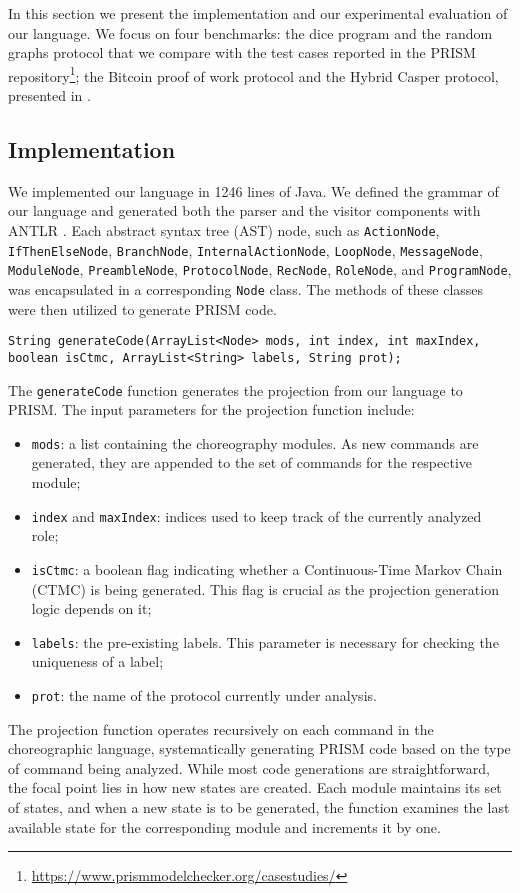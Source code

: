 In this section we present the implementation and our experimental evaluation of our language. 
We focus on four benchmarks: the dice program and the random graphs protocol that we compare with the  
test cases reported in the PRISM repository\footnote{\url{https://www.prismmodelchecker.org/casestudies/}}; 
the Bitcoin proof of work protocol and the Hybrid Casper protocol, 
presented in \cite{DBLP:journals/concurrency/BistarelliNGLMV23,DBLP:journals/distribledger/GallettaLMV23}.
\subsection{Implementation}
We implemented our language in 1246 lines of Java.
We defined the grammar of our language and generated both the parser and the visitor components with ANTLR \cite{ANTLR}.
Each abstract syntax tree (AST) node, such as {\tt ActionNode}, {\tt IfThenElseNode}, {\tt BranchNode}, {\tt InternalActionNode}, {\tt LoopNode}, {\tt MessageNode}, {\tt ModuleNode}, {\tt PreambleNode}, {\tt ProtocolNode}, {\tt RecNode}, {\tt RoleNode}, and {\tt ProgramNode}, was encapsulated in a corresponding {\tt Node} class. The methods of these classes were then utilized to generate PRISM code.
\begin{lstlisting}[language=Eclipse,caption=The \texttt{generateCode} function.,label=genfun1,numbers=none]
	String generateCode(ArrayList<Node> mods, int index, int maxIndex, boolean isCtmc, ArrayList<String> labels, String prot);	
\end{lstlisting}
The {\tt generateCode} function generates the projection from our language to PRISM.
The input parameters for the projection function include:
\begin{itemize}
\item \texttt{mods}: a list containing the choreography modules. As new commands are generated, they are appended to the set of commands for the respective module;
\item \texttt{index} and \texttt{maxIndex}: indices used to keep track of the currently analyzed role;
\item \texttt{isCtmc}: a boolean flag indicating whether a Continuous-Time Markov Chain (CTMC) is being generated. This flag is crucial as the projection generation logic depends on it;
\item \texttt{labels}: the pre-existing labels. This parameter is necessary for checking the uniqueness of a label;
\item \texttt{prot}: the name of the protocol currently under analysis.
\end{itemize}
The projection function operates recursively on each command in the choreographic language, systematically generating PRISM code based on the type of command being analyzed. While most code generations are straightforward, the focal point lies in how new states are created. Each module maintains its set of states, and when a new state is to be generated, the function examines the last available state for the corresponding module and increments it by one.

